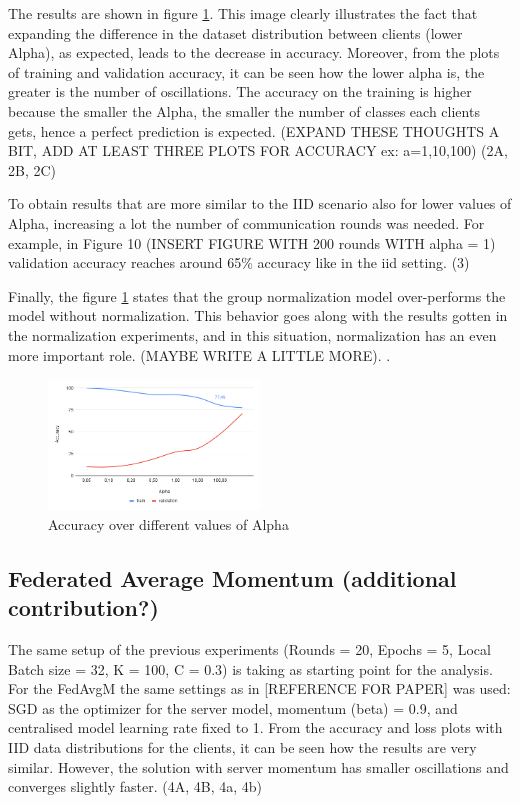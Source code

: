 \documentclass[twocolumn]{article}
\begin{document}
The results are shown in figure \ref{AccAlpha}. This image clearly illustrates the fact that expanding the difference in the dataset distribution between clients (lower Alpha), as expected, leads to the decrease in accuracy. 
Moreover, from the plots of training and validation accuracy, it can be seen how the lower alpha is, the greater is the number of oscillations.
The accuracy on the training is higher because the smaller the Alpha, the smaller the number of classes each clients gets, hence a perfect prediction is expected. 
(EXPAND THESE THOUGHTS A BIT, ADD AT LEAST THREE PLOTS FOR ACCURACY ex: a=1,10,100)
(2A, 2B, 2C)

To obtain results that are more similar to the IID scenario also for lower values of Alpha, increasing a lot the number of communication rounds was needed. For example, in Figure 10 (INSERT FIGURE WITH 200 rounds WITH alpha = 1) validation accuracy reaches around 65\% accuracy like in the iid setting.
(3)

Finally, the figure \ref{AccAlpha} states that the group normalization model over-performs the model without normalization. This behavior goes along with the results gotten in the normalization experiments, and in this situation, normalization has an even more important role. (MAYBE WRITE A LITTLE MORE).
.


\begin{figure}
    \centering
    \includegraphics[width=0.5\textwidth,height=.3\textheight]{alphaAccuracy.png}
    \caption{Accuracy over different values of Alpha}
    \label{AccAlpha} 
\end{figure}


\subsection{Federated Average Momentum (additional contribution?)}

The same setup of the previous experiments (Rounds = 20, Epochs = 5, Local Batch size = 32, K = 100, C = 0.3) is taking as starting point for the analysis.
For the FedAvgM the same settings as in [REFERENCE FOR PAPER] was used: SGD as the optimizer for the server model,  momentum (beta) = 0.9, and centralised model learning rate fixed to 1.
From the accuracy and loss plots with IID data distributions for the clients, it can be seen how the results are very similar. However, the solution with server momentum has smaller oscillations and converges slightly faster. 
(4A, 4B, 4a, 4b)
\end{document}
